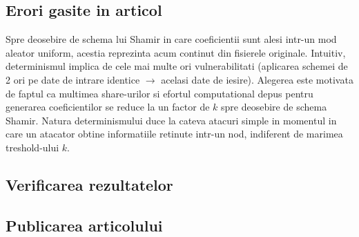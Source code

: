 \documentclass{llncs}
\begin{document}
\subsection{Erori gasite in articol}


Spre deosebire de schema lui Shamir in care coeficientii sunt alesi intr-un mod aleator uniform, acestia
reprezinta acum continut din fisierele originale.
Intuitiv, determinismul implica de cele mai multe ori vulnerabilitati (aplicarea schemei de 2 ori pe date de intrare identice $\rightarrow$ acelasi date de iesire).
Alegerea este motivata de faptul ca multimea share-urilor si efortul computational depus pentru generarea coeficientilor se reduce la un factor de $k$ spre deosebire de schema Shamir. Natura determinismului duce la cateva atacuri simple in momentul in care un atacator obtine informatiile retinute intr-un nod, indiferent de marimea treshold-ului $k$.


\subsection{Verificarea rezultatelor}
\subsection{Publicarea articolului}

%
%
%



\end{document}
